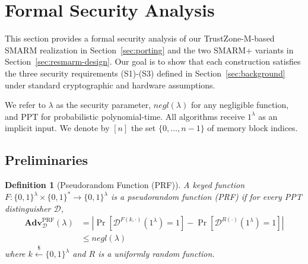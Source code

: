 \documentclass{ieeeaccess}
\newtheorem{definition}{Definition}
\newcommand{\Adv}{\mathbf{Adv}}
\begin{document}






\appendices

\section{\break Formal Security Analysis}
\label{sec:formal-security}
 
This section provides a formal security analysis of our TrustZone-M-based SMARM realization in Section~\ref{sec:porting} and the two SMARM+ variants in Section~\ref{sec:resmarm-design}.
Our goal is to show that each construction satisfies the three security requirements (S1)-(S3) defined in Section~\ref{sec:background} under standard cryptographic and hardware assumptions.
 
We refer to $\lambda$ as the security parameter, $\mathit{negl}(\lambda)$ for
any negligible function, and PPT for probabilistic polynomial-time.
All algorithms receive $1^{\lambda}$ as an implicit input.
We denote by $[n]$ the set $\{0,\dots,n{-}1\}$ of memory block indices.
 
\subsection{Preliminaries}
\label{sec:prelim}
 
\begin{definition}[Pseudorandom Function (PRF)]
\label{def:prf}
A keyed function $F : \{0,1\}^{\lambda} \times \{0,1\}^{*} \to \{0,1\}^{\lambda}$
is a \emph{pseudorandom function} (PRF) if for every PPT distinguisher
$\mathcal{D}$,
\[
\begin{aligned}
  \Adv^{\mathrm{PRF}}_{\mathcal{D}}(\lambda)
  &=
  \left|
    \Pr\!\left[
      \mathcal{D}^{F(k,\cdot)}(1^{\lambda}) = 1
    \right]
    -
    \Pr\!\left[
      \mathcal{D}^{R(\cdot)}(1^{\lambda}) = 1
    \right]
  \right| \\
  &\leq \mathit{negl}(\lambda)
\end{aligned}
\]
where $k \xleftarrow{\$} \{0,1\}^{\lambda}$ and $R$ is a uniformly random
function.
\end{definition}
 
\end{document}
